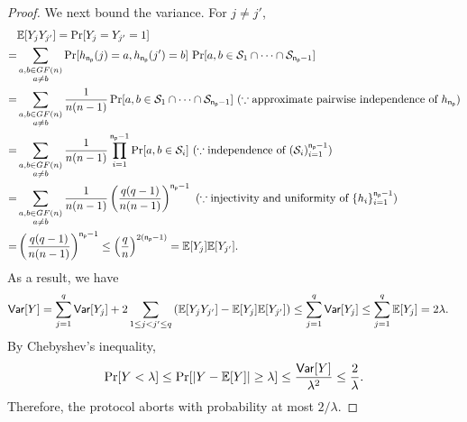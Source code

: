 \begin{proof}
We next bound the variance. For $j\ne j'$,
\[
\begin{aligned}
&\mathbb E[Y_jY_{j'}]=\Pr[Y_j=Y_{j'}=1]\\
=&
\sum_{\substack{a,b\in GF(n)\\a\ne b}}
\Pr[h_{\mathsf{n_p}}(j)=a,h_{\mathsf{n_p}}(j')=b]\,
\Pr[a,b\in \mathcal{S}_1\cap\cdots\cap\mathcal{S}_{\mathsf{n_p}-1}] \\
=&
\sum_{\substack{a,b\in GF(n)\\a\ne b}}
\frac{1}{n(n-1)}
\Pr[a,b\in \mathcal{S}_1\cap\cdots\cap\mathcal{S}_{\mathsf{n_p}-1}]
\
(\because \text{approximate pairwise independence of $h_{\mathsf{n_p}}$})\\
=&
\sum_{\substack{a,b\in GF(n)\\a\ne b}}
\frac{1}{n(n-1)}
\prod_{i=1}^{\mathsf{n_p}-1}\Pr[a,b\in\mathcal{S}_i]
\
(\because \mbox{independence of $(\mathcal{S}_i)_{i=1}^{\mathsf{n_p}-1}$}) \\
=&
\sum_{\substack{a,b\in GF(n)\\a\ne b}}
\frac{1}{n(n-1)}
\left(\frac{q(q-1)}{n(n-1)}\right)^{\mathsf{n_p}-1} \ (\because \mbox{injectivity and uniformity of $\{h_i\}_{i=1}^{\mathsf{n_p}-1}$})\\
=&
\left(\frac{q(q-1)}{n(n-1)}\right)^{\mathsf{n_p}-1}\le
\left(\frac qn\right)^{2(\mathsf{n_p}-1)}
=
\mathbb E[Y_j]\mathbb E[Y_{j'}].
\end{aligned}
\]
As a result, we have
\[
\begin{aligned}
\mathsf{Var}[Y]
&=
\sum_{j=1}^q\mathsf{Var}[Y_j]
+
2\sum_{1\leq j<j'\leq q}
\left(\mathbb E[Y_jY_{j'}]-\mathbb E[Y_j]\mathbb E[Y_{j'}]\right) 
\leq
\sum_{j=1}^q\mathsf{Var}[Y_j]
\leq
\sum_{j=1}^q\mathbb E[Y_j]
=
2\lambda.
\end{aligned}
\]
By Chebyshev's inequality,
\[
\Pr[Y<\lambda]
\leq
\Pr[|Y-\mathbb E[Y]|\geq\lambda]
\leq
\frac{\mathsf{Var}[Y]}{\lambda^2}
\leq
\frac{2}{\lambda}.
\]
Therefore, the protocol aborts with probability at most $2/\lambda$.
%

\end{proof}
